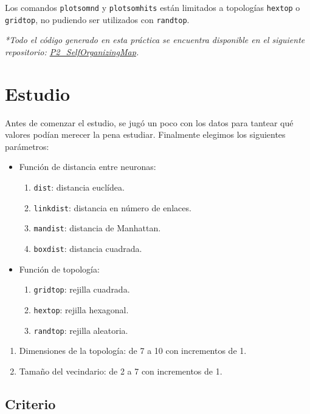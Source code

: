 \documentclass[a4paper,12pt,titlepage]{article}
\begin{document}
Los comandos \lstinline|plotsomnd| y \lstinline|plotsomhits| están limitados a topologías \lstinline|hextop| o \lstinline|gridtop|, no pudiendo ser utilizados con \lstinline|randtop|. 

\emph{*Todo el código generado en esta práctica se encuentra disponible en el siguiente repositorio: 
\href{https://github.com/davidmigloz/neuronal-networks/tree/master/P2\_SelfOrganizingMap}{P2\_SelfOrganizingMap}.}

\section{Estudio}

Antes de comenzar el estudio, se jugó un poco con los datos para tantear qué valores podían merecer la pena estudiar. Finalmente elegimos los siguientes parámetros:

\begin{itemize}[noitemsep]
	\item  Función de distancia entre neuronas:
	\begin{enumerate}[noitemsep]
		\item \lstinline|dist|: distancia euclídea.
		\item \lstinline|linkdist|: distancia en número de enlaces.
		\item \lstinline|mandist|: distancia de Manhattan.
		\item \lstinline|boxdist|: distancia cuadrada.
	\end{enumerate}
	\item Función de topología:
	\begin{enumerate}[noitemsep]
		\item \lstinline|gridtop|: rejilla cuadrada.
		\item \lstinline|hextop|: rejilla hexagonal.
		\item \lstinline|randtop|: rejilla aleatoria.
	\end{enumerate}	
\end{itemize}
\begin{enumerate}[noitemsep]
	\item Dimensiones de la topología: de 7 a 10 con incrementos de 1.
	\item Tamaño del vecindario: de 2 a 7 con incrementos de 1.
\end{enumerate}

\subsection{Criterio}
\end{document}
